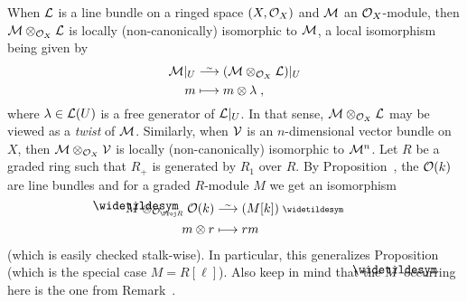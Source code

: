 \documentclass[a4paper,parskip=half,numbers=enddot, DIV=12]{scrreprt}
\begin{document}
\begin{rem}
	When $\mathcal{L}$ is a line bundle on a ringed space $(X,\mathcal{O}_X)$ and $\mathcal{M}$ an $\mathcal{O}_X$-module, then $\mathcal{M}\otimes_{\mathcal{O}_X}\mathcal{L}$ is locally (non-canonically) isomorphic to $\mathcal{M}$, a local isomorphism being given by 
	\begin{align*}
		\Mm|_U&\isomorphism (\Mm\otimes_{\Oo_X}\Ll)|_U\\
		m&\longmapsto m\otimes \lambda\;,
	\end{align*}
	where $\lambda\in\mathcal{L}(U)$ is a free generator of $\mathcal{L}|_U$. In that sense, $\mathcal{M}\otimes_{\mathcal{O}_X}\mathcal{L}$ may be viewed as a \emph{twist} of $\mathcal{M}$. Similarly, when $\mathcal{V}$ is an $n$-dimensional vector bundle on $X$, then $\mathcal{M}\otimes_{\mathcal{O}_X}\mathcal{V}$ is locally (non-canonically) isomorphic to  $\mathcal{M}^n$.
	Let $R$ be a graded ring such that $R_+$ is generated by $R_1$ over $R$. By Proposition~, the $\mathcal{O}(k)$ are line bundles and for a graded $R$-module $M$ we get an isomorphism
	\begin{align*}
		\snake{M}\otimes_{\Oo_{\Proj R}}\Oo(k)&\isomorphism (M[k])^\qcmod\\
		m\otimes r&\longmapsto rm
	\end{align*}
	(which is easily checked stalk-wise). In particular, this generalizes Proposition~ (which is the special case $M=R[\ell]$). Also keep in mind that the $\snake{M}$ occurring here is the one from Remark~.
\end{rem}
\end{document}
